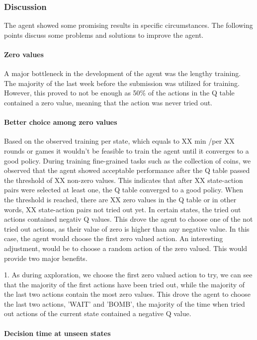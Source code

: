 \documentclass[
	letterpaper, %
	10pt, %
]{CSUniSchoolLabReport}
\begin{document}
\subsubsection{Discussion}
The agent showed some promising results in specific circumstances. The following points discuss
some problems and solutions to improve the agent.

\paragraph*{Zero values}
A major bottleneck in the development of the agent was the lengthy training. The majority of
the last week before the submission was utilized for training. However, this proved to not be enough as 50\%
of the actions in the Q table contained a zero value, meaning that the action was never tried out.

\paragraph*{Better choice among zero values}
Based on the observed training per state, which equals to XX min /per XX rounds or games it wouldn't
be feasible to train the agent until it converges to a good policy. During training fine-grained
tasks such as the collection of coins, we observed that the agent showed acceptable performance
after the Q table passed the threshold of XX non-zero values. This indicates that after XX state-action pairs
were selected at least one, the Q table converged to a good policy.
When the threshold is reached, there are XX zero values in the Q table or in other words, XX state-action pairs not
tried out yet. In certain states, the tried out actions contained negativ Q values. This drove the agent to
choose one of the not tried out actions, as their value of zero is higher than any negative value.
In this case, the agent would choose the first zero valued action. An interesting adjustment, would
be to choose a random action of the zero valued. This would provide two major benefits.

1. As during axploration, we choose the first zero valued action to try, we can see that the
majority of the first actions have been tried out, while the majority of the last two actions contain the most zero values.
This drove the agent to choose the last two actions, 'WAIT' and 'BOMB', the majority of the time
when tried out actions of the current state contained a negative Q value.

\paragraph*{Decision time at unseen states}
\end{document}
